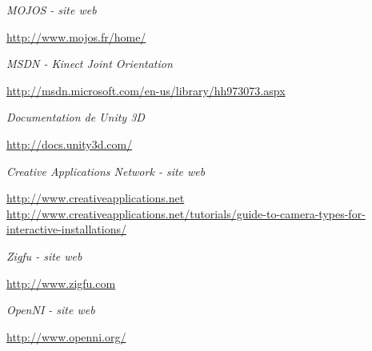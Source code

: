 \begin{thebibliography}{9}
  \emph{MOJOS - site web}\\
  \begin{small}
  \url{http://www.mojos.fr/home/}
  \end{small}
  
  \emph{MSDN - Kinect Joint Orientation}\\
  \begin{small}
  \url{http://msdn.microsoft.com/en-us/library/hh973073.aspx}
  \end{small}
  
  \emph{Documentation de Unity 3D}\\
  \begin{small}
  \url{http://docs.unity3d.com/}
  \end{small}

  \emph{Creative Applications Network - site web}\\
  \begin{small}
  \url{http://www.creativeapplications.net}
  \url{http://www.creativeapplications.net/tutorials/guide-to-camera-types-for-interactive-installations/}
  \end{small}
  
  \emph{Zigfu - site web}\\
  \begin{small}
  \url{http://www.zigfu.com}
  \end{small}

  \emph{OpenNI - site web}\\
  \begin{small}
  \url{http://www.openni.org/}
  \end{small}
  
\end{thebibliography}